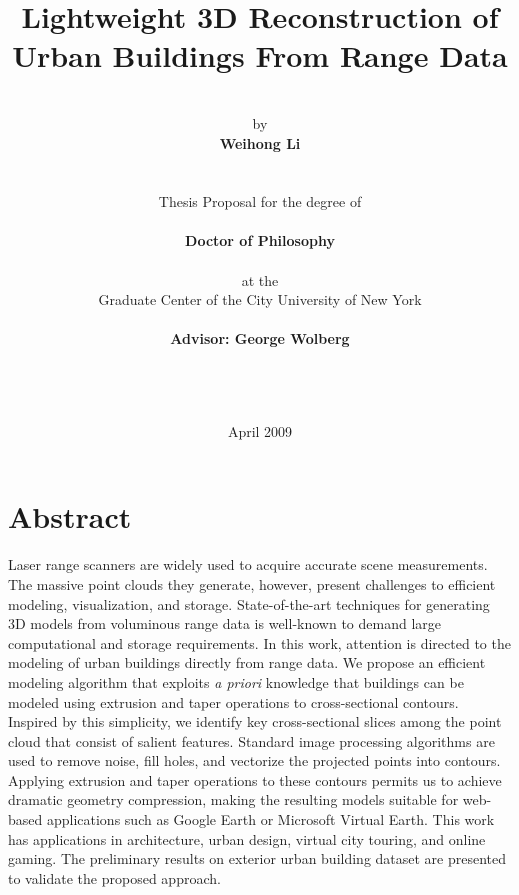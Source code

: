 \documentclass[12pt,letterpaper]{article}
\newcommand{\twocol}{0}
\renewcommand{\twocol}{true}
\begin{document}
\title{\textbf{Lightweight 3D Reconstruction of Urban Buildings From Range Data}}
\author{
\\
by \\
\textbf{Weihong Li}
\\
\\
\\
Thesis Proposal for the degree of \\
\\
\textbf{Doctor of Philosophy} \\
\\
at the
\\
Graduate Center of the City University of New York \\
\\
\textbf{Advisor: George Wolberg}\\
\\
\\
\\
}
\date{April 2009}
\maketitle

\ifthenelse{\equal{\twocol}{true}}{
\tableofcontents
}{
\newpage %
\tableofcontents
\newpage %
}

\section{Abstract}
Laser range scanners are widely used to acquire accurate scene measurements.
The massive point clouds they generate, however, present challenges to
efficient modeling, visualization, and storage.
State-of-the-art techniques for generating 3D models from voluminous
range data is well-known to demand large computational and storage requirements.
In this work, attention is directed to the modeling of urban buildings
directly from range data.
We propose an efficient modeling algorithm that exploits \emph{a priori}
knowledge that buildings can be modeled using extrusion and taper operations
to cross-sectional contours.
Inspired by this simplicity, we identify key cross-sectional slices among
the point cloud that consist of salient features.
Standard image processing algorithms are used to remove noise, fill holes,
and vectorize the projected points into contours.
Applying extrusion and taper operations to these contours
permits us to achieve dramatic geometry compression, making the resulting
models suitable for web-based applications such as Google Earth
or Microsoft Virtual Earth.
This work has applications in architecture, urban design, virtual city
touring, and online gaming.
The preliminary results on exterior urban building dataset are presented to
validate the proposed approach.
\end{document}

